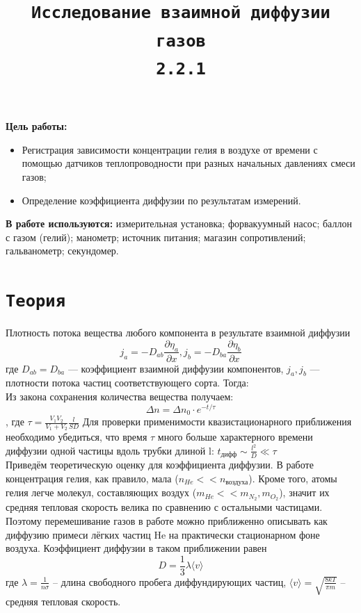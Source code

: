 \documentclass[11pt,a4paper]{article}
\title{\texttt{Исследование взаимной диффузии газов \\ 2.2.1}}
\author{}
\date{}
\begin{document}
  \maketitle

\textbf{Цель работы:}
\begin{itemize}
  \item  Регистрация зависимости концентрации гелия в воздухе
  от времени с помощью датчиков теплопроводности при разных
  начальных давлениях смеси газов;
  \item Определение коэффициента диффузии
   по результатам измерений.
\end{itemize}
\textbf{В работе используются:}  измерительная установка; форвакуумный
насос; баллон с газом (гелий); манометр; источник питания; магазин
сопротивлений; гальванометр; секундомер.

\section*{\texttt{Теория}}
Плотность потока вещества любого компонента в результате взаимной диффузии
\begin{equation}
  j_a = -D_{ab}\frac{\partial \eta_a}{\partial x},
  j_b = -D_{ba}\frac{\partial \eta_b}{\partial x}
\end{equation}
где $D_{ab} = D_{ba}$ — коэффициент взаимной диффузии компонентов,
$j_a, j_b$ — плотности потока частиц соответствующего сорта. Тогда: \\
Из закона сохранения количества вещества получаем: 
\begin{equation}
  \Delta n = \Delta n_0 \cdot e^{-t/\tau}
\end{equation}, где $\tau = \frac{V_1V_2}{V_1 + V_2} \frac{l}{SD}$
Для проверки применимости квазистационарного приближения необходимо убедиться,
что время $\tau$ много больше характерного времени
диффузии одной частицы вдоль трубки длиной l: $t_\text{дифф} \sim \frac{l^2}{D} \ll \tau$\\

Приведём теоретическую оценку для коэффициента диффузии. В работе концентрация гелия,
как правило, мала ($n_{He} << n_\text{воздуха}$). Кроме того, атомы гелия легче молекул, составляющих воздух
($m_{He} << m_{N_2}, m_{O_2}$), значит их средняя тепловая скорость велика по сравнению с остальными частицами.
Поэтому перемешивание газов в работе можно приближенно описывать как диффузию
примеси лёгких частиц He на практически стационарном фоне воздуха. Коэффициент диффузии
в таком приближении равен
\[D = \frac{1}{3}\lambda\langle v \rangle\]
где $\lambda = \frac{1}{n\sigma}$ -- длина свободного пробега диффундирующих частиц, $\langle v \rangle = \sqrt{\frac{8kT}{\pi m}}$ -- средняя тепловая скорость.
\end{document}
